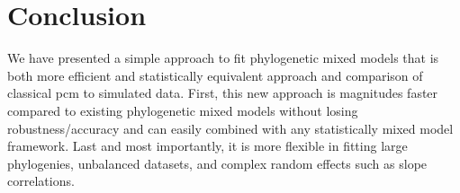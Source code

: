 % 
% 
% 
% 
% 
% 

\section{Conclusion}

We have presented a simple approach to fit phylogenetic mixed models that is both more efficient and statistically equivalent approach and comparison of classical pcm to simulated data. 
First, this new approach is magnitudes faster compared to existing phylogenetic mixed models without losing robustness/accuracy and can easily combined with any statistically mixed model framework. 
Last and most importantly, it is more flexible in fitting large phylogenies, unbalanced datasets, and complex random effects such as slope correlations.



